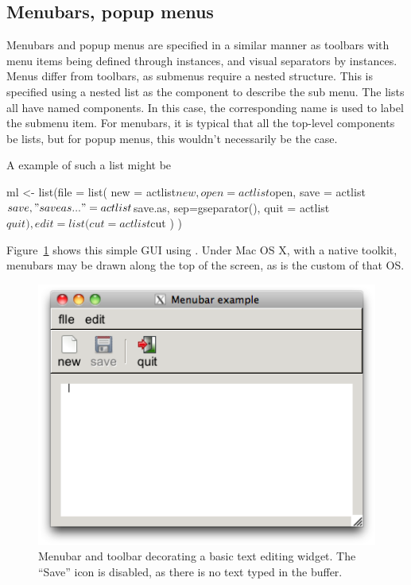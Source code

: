 \subsection{Menubars, popup menus}
\label{sec:gWidgets-menubars}

Menubars and popup menus are specified in a similar manner as toolbars with menu items
being defined through  instances, and visual separators
by  instances. Menus differ from toolbars, as
submenus require a nested structure. This  is specified using a
nested list as the component to describe the sub menu. The lists all
have named components. In this case, the corresponding name is used to
label the submenu item. For menubars, it is typical that all the
top-level components be lists, but for popup menus, this wouldn't
necessarily be the case.

A example of such a list might be
\begin{Schunk}
\begin{Sinput}
 ml <- list(file = list(
              new = actlist$new,
              open = actlist$open,
              save = actlist$save,
              "save as..." = actlist$save.as,
              sep=gseparator(),
              quit = actlist$quit
              ),
            edit = list(
              cut = actlist$cut
              )
            )
 
\end{Sinput}
\end{Schunk}


Figure~\ref{fig:fig-gWidgets-menubar-disabled} shows this simple GUI
using .  Under Mac OS X, with a native toolkit,
menubars may be drawn along the top of the screen, as is the custom of
that OS.

\begin{figure}
  \centering
  \includegraphics[width=.5\textwidth]{fig-gWidgets-menubar-disabled.png}
  \caption{Menubar and toolbar decorating a basic text editing
    widget. The ``Save'' icon is disabled, as there is no text typed
    in the buffer.}
  \label{fig:fig-gWidgets-menubar-disabled}
\end{figure}

